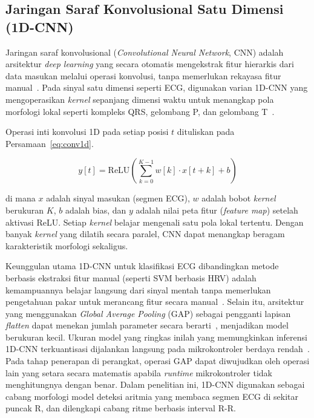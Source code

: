 \subsection{Jaringan Saraf Konvolusional Satu Dimensi (1D-CNN)}

Jaringan saraf konvolusional (\textit{Convolutional Neural Network}, CNN)
adalah arsitektur \textit{deep learning} yang secara otomatis mengekstrak fitur
hierarkis dari data masukan melalui operasi konvolusi, tanpa memerlukan
rekayasa fitur manual~\cite{kim_2023}. Pada sinyal satu dimensi seperti ECG,
digunakan varian 1D-CNN yang mengoperasikan \textit{kernel} sepanjang dimensi
waktu untuk menangkap pola morfologi lokal seperti kompleks QRS, gelombang P,
dan gelombang T~\cite{kiranyaz_2021}.

Operasi inti konvolusi 1D pada setiap posisi $t$ dituliskan pada Persamaan~\ref{eq:conv1d}.

\begin{equation}
\label{eq:conv1d}
y[t] = \text{ReLU}\!\left(\sum_{k=0}^{K-1} w[k] \cdot x[t+k] + b\right)
\end{equation}

di mana $x$ adalah sinyal masukan (segmen ECG), $w$ adalah bobot
\textit{kernel} berukuran $K$, $b$ adalah bias, dan $y$ adalah nilai peta
fitur (\textit{feature map}) setelah aktivasi ReLU. Setiap \textit{kernel}
belajar mengenali satu pola lokal tertentu. Dengan banyak \textit{kernel}
yang dilatih secara paralel, CNN dapat menangkap beragam karakteristik
morfologi sekaligus.

Keunggulan utama 1D-CNN untuk klasifikasi ECG dibandingkan metode
berbasis ekstraksi fitur manual (seperti SVM berbasis HRV) adalah
kemampuannya belajar langsung dari sinyal mentah tanpa memerlukan pengetahuan
pakar untuk merancang fitur secara manual~\cite{mekhfioui_2025}. Selain itu, arsitektur yang menggunakan \textit{Global Average Pooling} (GAP) sebagai pengganti
lapisan \textit{flatten} dapat menekan jumlah parameter secara berarti~\cite{mekhfioui_2025},
menjadikan model berukuran kecil. Ukuran model yang ringkas inilah yang
memungkinkan inferensi 1D-CNN terkuantisasi dijalankan langsung pada mikrokontroler
berdaya rendah~\cite{kim_2023}. Pada tahap penerapan di perangkat, operasi GAP dapat
diwujudkan oleh operasi lain yang setara secara matematis apabila \textit{runtime}
mikrokontroler tidak menghitungnya dengan benar. Dalam penelitian ini, 1D-CNN digunakan sebagai
cabang morfologi model deteksi aritmia yang membaca segmen ECG di sekitar puncak R,
dan dilengkapi cabang ritme berbasis interval R-R.

